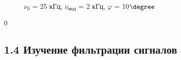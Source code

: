 \documentclass[a4paper,12pt]{article}
\theoremstyle{definition}
\begin{document}
\begin{enumerate}
\begin{figure}[h]
\begin{minipage}[h]{0.44\linewidth}
 $\nu_0$ = 25 кГц, $\nu_\text{мод}$ = 2 кГц, $\varphi$ = 10$\degree$  \\
\end{minipage}
\label{ris:experimentalcorrelationsignals}
\end{figure}


0

\end{enumerate}


\newpage










\subsection*{1.4 Изучение фильтрации сигналов}
\end{document}
